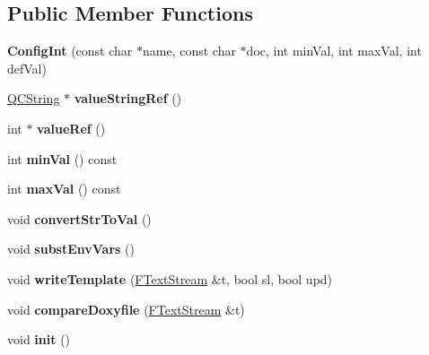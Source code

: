 \subsection*{Public Member Functions}
\begin{DoxyCompactItemize}
\item 
\mbox{\label{class_config_int_a07aa951c7f1a25bc0eec264b74015fb9}} 
{\bfseries Config\+Int} (const char $\ast$name, const char $\ast$doc, int min\+Val, int max\+Val, int def\+Val)
\item 
\mbox{\label{class_config_int_ae5592ee93881e4e45116f4b0533dc754}} 
\mbox{\hyperlink{class_q_c_string}{Q\+C\+String}} $\ast$ {\bfseries value\+String\+Ref} ()
\item 
\mbox{\label{class_config_int_a35bd47ef87d178b694f29b168945afc0}} 
int $\ast$ {\bfseries value\+Ref} ()
\item 
\mbox{\label{class_config_int_ae9fc76f1f588da6c5e4867b1943167fe}} 
int {\bfseries min\+Val} () const
\item 
\mbox{\label{class_config_int_a491b02657945f80a7ffb5cb9b3562ab7}} 
int {\bfseries max\+Val} () const
\item 
\mbox{\label{class_config_int_ac4e9191ee5da6cef185c07dd686f94fb}} 
void {\bfseries convert\+Str\+To\+Val} ()
\item 
\mbox{\label{class_config_int_a9c8052e1163a97d8d798b317c2eb1cbf}} 
void {\bfseries subst\+Env\+Vars} ()
\item 
\mbox{\label{class_config_int_a2194c67246255b4106f70604c3bfb48d}} 
void {\bfseries write\+Template} (\mbox{\hyperlink{class_f_text_stream}{F\+Text\+Stream}} \&t, bool sl, bool upd)
\item 
\mbox{\label{class_config_int_a3367e0265c9f83cf4809e4d8d81fc2b9}} 
void {\bfseries compare\+Doxyfile} (\mbox{\hyperlink{class_f_text_stream}{F\+Text\+Stream}} \&t)
\item 
\mbox{\label{class_config_int_a20733b898775fb0b75c9a3e70662c3bf}} 
void {\bfseries init} ()
\end{DoxyCompactItemize}
